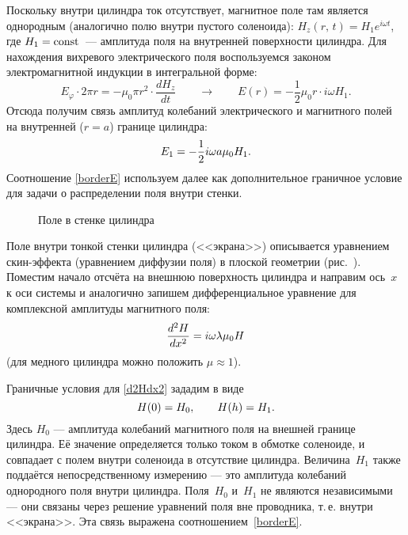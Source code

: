 Поскольку внутри цилиндра ток отсутствует, магнитное поле там является
однородным (аналогично полю внутри пустого соленоида):
$H_z(r,\,t)=H_1 e^{i\omega t}$, где $H_1=\mathrm{const}$~--- амплитуда поля на внутренней
поверхности цилиндра. Для нахождения вихревого электрического поля
воспользуемся законом электромагнитной индукции  в интегральной
форме:
\[
E_{\varphi}\cdot 2\pi r = -\mu_0 \pi r^2 \cdot \frac{dH_z}{dt}\qquad
\to
\qquad
E(r) = -\frac12 \mu_0 r \cdot i\omega H_1.
\]
Отсюда получим связь амплитуд колебаний электрического и магнитного полей
на внутренней ($r=a$) границе цилиндра:
\begin{equation}\eqmark{borderE}
E_1 = -\frac12  i\omega a\mu_0 H_1.
\end{equation}
Соотношение \eqref{borderE} используем далее как дополнительное граничное
условие для задачи о распределении поля внутри стенки.

\begin{wrapfigure}{o}{0.27\textwidth}
    \caption{Поле в стенке цилиндра}
\end{wrapfigure}
Поле внутри тонкой стенки цилиндра (<<экрана>>) описывается уравнением скин-эффекта
 (уравнением диффузии поля) в плоской геометрии
(рис.~).
Поместим начало отсчёта на внешнюю поверхность цилиндра и направим ось~$x$
к оси системы и аналогично 
запишем дифференциальное уравнение для комплексной амплитуды магнитного поля:
\begin{equation}\eqmark{d2Hdx2}
\frac{d^2H}{dx^2} = i\omega \lambda \mu_0 H
\end{equation}
(для медного цилиндра можно положить $\mu\approx 1$).

Граничные условия для \eqref{d2Hdx2} зададим в виде
\begin{equation}\eqmark{borderH}
H(0) = H_0,\qquad H(h) = H_1.
\end{equation}
Здесь $H_0$ --- амплитуда колебаний магнитного поля на внешней
границе цилиндра. Её значение определяется только током
в обмотке соленоиде, и совпадает с полем внутри соленоида
в отсутствие цилиндра. Величина~$H_1$ также поддаётся непосредственному
измерению --- это амплитуда колебаний однородного поля внутри цилиндра.
Поля~$H_0$ и~$H_1$ не являются независимыми --- они связаны через
решение уравнений поля вне проводника, т.\,е. внутри <<экрана>>. Эта связь
выражена соотношением~\eqref{borderE}.


